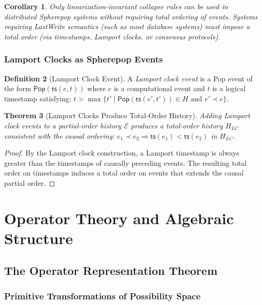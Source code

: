 \documentclass[12pt, a4paper, openany]{book}
\theoremstyle{plain}
\newtheorem{theorem}{Theorem}[chapter]
\newtheorem{corollary}[theorem]{Corollary}
\theoremstyle{definition}
\newtheorem{definition}[theorem]{Definition}
\theoremstyle{remark}
\newcommand{\Pop}{\mathsf{Pop}}
\begin{document}
\begin{corollary}
Only linearization-invariant collapse rules can be used in distributed Spherepop
systems without requiring total ordering of events. Systems requiring LastWrite
semantics (such as most database systems) must impose a total order (via
timestamps, Lamport clocks, or consensus protocols).
\end{corollary}

\section{Lamport Clocks as Spherepop Events}

\begin{definition}[Lamport Clock Event]
A \emph{Lamport clock event} is a Pop event of the form $\Pop(\mathsf{ts}(e, t))$
where $e$ is a computational event and $t$ is a logical timestamp satisfying:
$t > \max\{t' \mid \Pop(\mathsf{ts}(e', t')) \in H \text{ and } e' \prec e\}$.
\end{definition}

\begin{theorem}[Lamport Clocks Produce Total-Order History]
Adding Lamport clock events to a partial-order history $\mathcal{E}$ produces
a total-order history $H_{LC}$ consistent with the causal ordering:
$e_1 \prec e_2 \Rightarrow \mathsf{ts}(e_1) < \mathsf{ts}(e_2)$ in $H_{LC}$.
\end{theorem}

\begin{proof}
By the Lamport clock construction, a Lamport timestamp is always greater than
the timestamps of causally preceding events. The resulting total order on
timestamps induces a total order on events that extends the causal partial order.
\end{proof}


\part{Operator Theory and Algebraic Structure}

\chapter{The Operator Representation Theorem}

\section{Primitive Transformations of Possibility Space}
\end{document}
